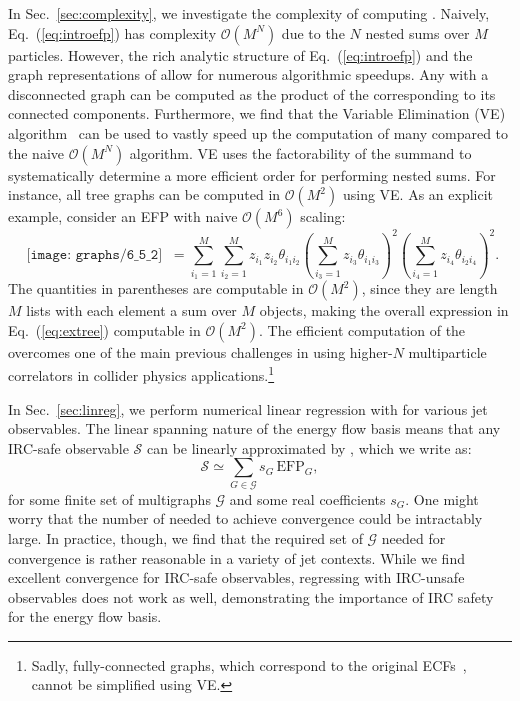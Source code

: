 \documentclass[letterpaper,11pt]{article}
\DeclareRobustCommand{\Sec}[1]{Sec.~\ref{#1}}
\DeclareRobustCommand{\Eq}[1]{Eq.~(\ref{#1})}
\newcommand{\B}{\text{EFP}\xspace}
\newcommand{\Bs}{\text{EFPs}\xspace}
\begin{document}
In \Sec{sec:complexity}, we investigate the complexity of computing \Bs.
%
Naively, \Eq{eq:introefp} has complexity $\mathcal O(M^N)$ due to the $N$ nested sums over $M$ particles.
%
However, the rich analytic structure of \Eq{eq:introefp} and the graph representations of \Bs allow for numerous algorithmic speedups.
%
Any \B with a disconnected graph can be computed as the product of the \Bs corresponding to its connected components.
%
Furthermore, we find that the Variable Elimination (VE) algorithm~\cite{zhang1996exploiting} can be used to vastly speed up the computation of many \Bs compared to the naive $\mathcal O(M^N)$ algorithm.
%
VE uses the factorability of the summand to systematically determine a more efficient order for performing nested sums.
%
For instance, all tree graphs can be computed in $\mathcal O(M^2)$ using VE. 
%
As an explicit example, consider an EFP with naive $\mathcal O(M^6)$ scaling:
%
\begin{equation}\label{eq:extree}
\begin{gathered}
\texttt{[image: graphs/6\_5\_2]}
\end{gathered}
\,=\sum_{i_1=1}^M\sum_{i_2=1}^Mz_{i_1}z_{i_2}\theta_{i_1i_2}\left(\sum_{i_3=1}^Mz_{i_3}\theta_{i_1i_3}\right)^2\left(\sum_{i_4=1}^Mz_{i_4}\theta_{i_2i_4}\right)^2.
\end{equation}
The quantities in parentheses are computable in $\mathcal O(M^2)$, since they are length $M$ lists with each element a sum over $M$ objects, making the overall expression in \Eq{eq:extree} computable in $\mathcal O(M^2)$.
%
The efficient computation of the \Bs overcomes one of the main previous challenges in using higher-$N$ multiparticle correlators in collider physics applications.\footnote{Sadly, fully-connected graphs, which correspond to the original ECFs~\cite{Larkoski:2013eya}, cannot be simplified using VE.} 

In \Sec{sec:linreg}, we perform numerical linear regression with \Bs for various jet observables.
%
The linear spanning nature of the energy flow basis means that any IRC-safe observable $\mathcal S$ can be linearly approximated by \Bs, which we write as:
%
\begin{equation}\label{eq:introefpsspan}
\mathcal S\simeq\sum_{G\in\mathcal G}s_G \, \B_G,
\end{equation}
%
for some finite set of multigraphs $\mathcal G$ and some real coefficients $s_G$.  
%
One might worry that the number of \Bs needed to achieve convergence could be intractably large.
%
In practice, though, we find that the required set of $\mathcal G$ needed for convergence is rather reasonable in a variety of jet contexts.
%
While we find excellent convergence for IRC-safe observables, regressing with IRC-unsafe observables does not work as well, demonstrating the importance of IRC safety for the energy flow basis.
\end{document}
